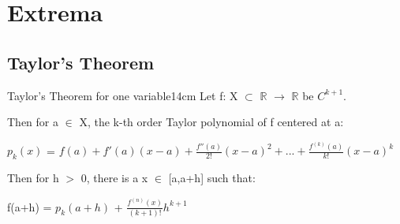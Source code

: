\newpage

\section[Day 4: Extrema]{ Extrema }

\subsection{ Taylor's Theorem }

    \begin{wtheorem}{Taylor's Theorem for one variable}{14cm}
        Let f: X $\subset$ $\mathbb{R}$ $\rightarrow$ $\mathbb{R}$
        be $C^{k+1}$.
        
        Then for a $\in$ X, the k-th order Taylor polynomial of f centered at a:

        \hspace{0.5cm}
        $p_k(x)$
        = $f(a) + f'(a)(x-a) + \frac{f''(a)}{2!}(x-a)^2
            + ... + \frac{f^{(k)}(a)}{k!}(x-a)^k$

        Then for h $>$ 0, there is a x $\in$ [a,a+h] such that:

        \hspace{0.5cm}
        f(a+h) = $p_k(a+h)$ + $\frac{f^{(n)}(x)}{(k+1)!}h^{k+1}$
    \end{wtheorem}

